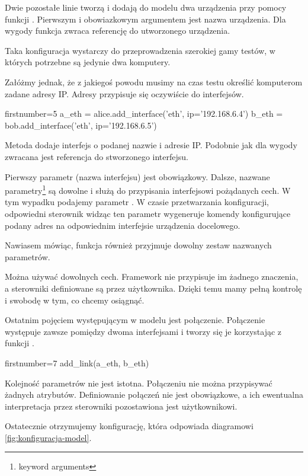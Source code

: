 \documentclass[00-praca-magisterska.tex]{subfiles}
\begin{document}
Dwie pozostałe linie tworzą i dodają do modelu dwa urządzenia przy pomocy
funkcji . Pierwszym i obowiazkowym argumentem jest nazwa
urządzenia. Dla wygody funkcja zwraca referencję do utworzonego urządzenia.

Taka konfiguracja wystarczy do przeprowadzenia szerokiej gamy testów, w
których potrzebne są jedynie dwa komputery.

Załóżmy jednak, że z jakiegoś powodu musimy na czas testu określić komputerom
zadane adresy IP. Adresy przypisuje się oczywiście do interfejsów.

\begin{pythoncode*}{firstnumber=5}
  a_eth = alice.add_interface('eth', ip='192.168.6.4')
  b_eth = bob.add_interface('eth', ip='192.168.6.5')
\end{pythoncode*}

Metoda  dodaje interfejs o podanej nazwie i adresie IP.
Podobnie jak  dla wygody zwracana jest referencja do
stworzonego interfejsu.

Pierwszy parametr (nazwa interfejsu) jest obowiązkowy. Dalsze, nazwane
parametry\footnote{keyword arguments} są dowolne i służą do przypisania
interfejsowi pożądanych cech.  W tym wypadku podajemy parametr . W
czasie przetwarzania konfiguracji, odpowiedni sterownik widząc ten parametr
wygeneruje komendy konfigurujące podany adres na odpowiednim interfejsie
urządzenia docelowego.

Nawiasem mówiąc, funkcja  również przyjmuje dowolny zestaw
nazwanych parametrów.

Można używać dowolnych cech. Framework nie przypisuje im żadnego znaczenia, a
sterowniki definiowane są przez użytkownika. Dzięki temu mamy pełną kontrolę i
swobodę w tym, co chcemy osiągnąć.

Ostatnim pojęciem występującym w modelu jest połączenie. Połączenie występuje
zawsze pomiędzy dwoma interfejsami i tworzy się je korzystając z funkcji
.

\begin{pythoncode*}{firstnumber=7}
  add_link(a_eth, b_eth)
\end{pythoncode*}

Kolejność parametrów nie jest istotna. Połączeniu nie można przypisywać żadnych
atrybutów. Definiowanie połączeń nie jest obowiązkowe, a ich ewentualna
interpretacja przez sterowniki pozostawiona jest użytkownikowi. 

Ostatecznie otrzymujemy konfigurację, która odpowiada diagramowi \ref{fig:konfiguracja-model}.
\end{document}
